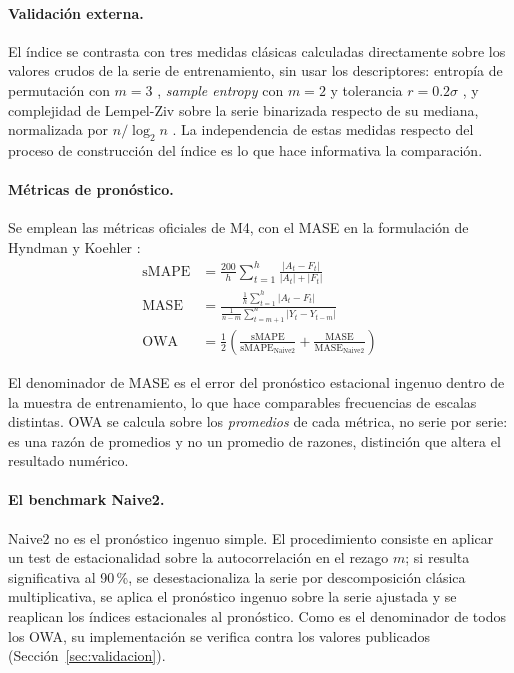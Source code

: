 \paragraph{Validación externa.} El índice se contrasta con tres medidas clásicas
calculadas directamente sobre los valores crudos de la serie de entrenamiento, sin
usar los descriptores: entropía de permutación con $m=3$ \cite{bandt2002},
\emph{sample entropy} con $m=2$ y tolerancia $r=0.2\sigma$ \cite{richman2000}, y
complejidad de Lempel-Ziv sobre la serie binarizada respecto de su mediana,
normalizada por $n/\log_2 n$ \cite{lempel1976}. La independencia de estas medidas
respecto del proceso de construcción del índice es lo que hace informativa la
comparación.

\paragraph{Métricas de pronóstico.} Se emplean las métricas oficiales de M4, con el
MASE en la formulación de Hyndman y Koehler \cite{hyndman2006}:
\begin{align}
\mathrm{sMAPE} &= \frac{200}{h}\sum_{t=1}^{h}
   \frac{|A_t - F_t|}{|A_t| + |F_t|} \\[2mm]
\mathrm{MASE}  &= \frac{\frac{1}{h}\sum_{t=1}^{h}|A_t - F_t|}
   {\frac{1}{n-m}\sum_{t=m+1}^{n}|Y_t - Y_{t-m}|} \\[2mm]
\mathrm{OWA}   &= \frac{1}{2}\left(
   \frac{\mathrm{sMAPE}}{\mathrm{sMAPE}_{\mathrm{Naive2}}} +
   \frac{\mathrm{MASE}}{\mathrm{MASE}_{\mathrm{Naive2}}}\right)
\label{eq:owa}
\end{align}

El denominador de MASE es el error del pronóstico estacional ingenuo dentro de la
muestra de entrenamiento, lo que hace comparables frecuencias de escalas distintas.
OWA se calcula sobre los \emph{promedios} de cada métrica, no serie por serie: es
una razón de promedios y no un promedio de razones, distinción que altera el
resultado numérico.

\paragraph{El benchmark Naive2.} Naive2 no es el pronóstico ingenuo simple. El
procedimiento consiste en aplicar un test de estacionalidad sobre la
autocorrelación en el rezago $m$; si resulta significativa al 90\,\%, se
desestacionaliza la serie por descomposición clásica multiplicativa, se aplica el
pronóstico ingenuo sobre la serie ajustada y se reaplican los índices estacionales
al pronóstico. Como es el denominador de todos los OWA, su implementación se
verifica contra los valores publicados (Sección~\ref{sec:validacion}).


